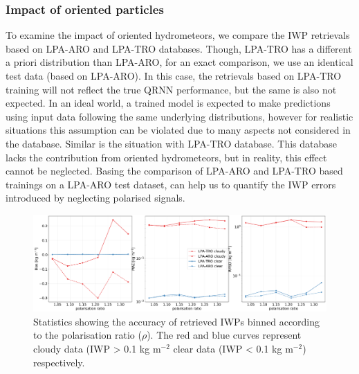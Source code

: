 \documentclass[amt, manuscript]{copernicus}
\begin{document}
 

\subsubsection{Impact of oriented particles}
\label{sec:impact_retrieval}
%
To examine the impact of oriented hydrometeors, we compare the IWP retrievals based on LPA-ARO and LPA-TRO databases. Though, LPA-TRO has a different a priori distribution than LPA-ARO, for an exact comparison, we use an identical test data (based on LPA-ARO). In this case, the retrievals based on LPA-TRO training will not reflect the true QRNN performance, but the same is also not expected. In an ideal world, a trained model is expected to make predictions using input data following the same underlying distributions, however for realistic situations this assumption can be violated due to many aspects not considered in the database. Similar is the situation with LPA-TRO database. This database lacks the contribution from oriented hydrometeors, but in reality, this effect cannot be neglected. Basing the comparison of LPA-ARO and LPA-TRO based trainings on a LPA-ARO test dataset, can help us to quantify the IWP errors introduced by neglecting polarised signals. 


\begin{figure}[t]
	\includegraphics[width=12cm]{Figures/statistics_cloudyclear.pdf}
	\caption{Statistics showing the accuracy of retrieved IWPs
		binned according to the polarisation ratio ($\rho$). The red and blue curves represent cloudy data (IWP > 0.1\,\,kg m$^{-2}$
		clear data (IWP < 0.1\,\,kg m$^{-2}$) respectively.}
	\label{fig:clear_cloudy}
\end{figure}
\end{document}
